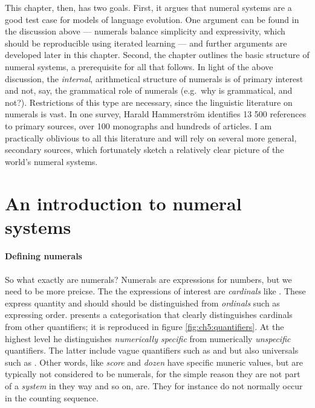 \documentclass{../src/bcthesispart}
\begin{document}
This chapter, then, has two goals.
First, it argues that numeral systems are a good test case for models of language evolution.
One argument can be found in the discussion above — numerals balance simplicity and expressivity, which should be reproducible using iterated learning — and further arguments are developed later in this chapter.
Second, the chapter outlines the basic structure of numeral systems, a prerequisite for all that follows.
In light of the above discussion, the \emph{internal}, arithmetical structure of numerals is of primary interest and not, say, the grammatical role of numerals (e.g.~why is  grammatical, and  not?).
Restrictions of this type are necessary, since the linguistic literature on numerals is vast.
In one survey, Harald Hammerström identifies 13 500 references to primary sources, over 100 monographs and hundreds of articles. 
I am practically oblivious to all this literature and will rely on several more general, secondary sources, which fortunately sketch a relatively clear picture of the world’s numeral systems.
	\nocite{Hurford1975, Hurford1987, Greenberg1978, Hammarstrom2009, Comrie2013, Hanke2010, VonMengden2008}





\section{An introduction to numeral systems}


\paragraph{Defining numerals}

So what exactly are numerals? 
Numerals are expressions for numbers, but we need to be more preicse.
The the expressions of interest are \emph{cardinals} like .
These express quantity and should should be distinguished from \emph{ordinals} such as  expressing order.
\textcite{VonMengden2008} presents a categorisation that clearly distinguishes cardinals from other quantifiers; it is reproduced in figure \ref{fig:ch5:quantifiers}.
At the highest level he distinguishes \emph{numerically specific} from numerically \emph{unspecific} quantifiers. The latter include vague quantifiers such as  and  but also universals such as .
Other words, like \emph{score} and \emph{dozen} have specific muneric values, but are typically not considered to be numerals, for the simple reason they are not part of a \emph{system} in they way  and so on, are. 
They for instance do not normally occur in the counting sequence. 
\end{document}
